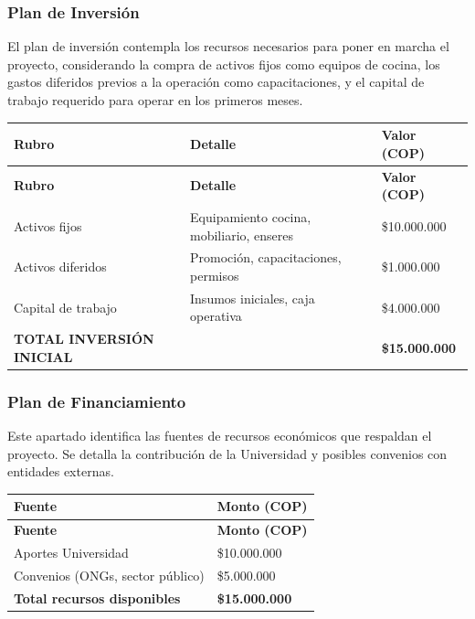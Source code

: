 \documentclass[letterpaper, 11pt]{report}
\begin{document}
\subsubsection{Plan de Inversión}
El plan de inversión contempla los recursos necesarios para poner en marcha el proyecto, considerando la compra de activos fijos como equipos de cocina, los gastos diferidos previos a la operación como capacitaciones, y el capital de trabajo requerido para operar en los primeros meses.

\bigskip

\begin{longtable}{|p{}|p{}|p{}|}
\hline
\textbf{Rubro} & \textbf{Detalle} & \textbf{Valor (COP)} \\
\hline
\endfirsthead

\hline
\textbf{Rubro} & \textbf{Detalle} & \textbf{Valor (COP)} \\
\hline
\endhead

\hline
\endfoot

\hline
\endlastfoot

Activos fijos & Equipamiento cocina, mobiliario, enseres & \$10.000.000 \\
\hline
Activos diferidos & Promoción, capacitaciones, permisos & \$1.000.000 \\
\hline
Capital de trabajo & Insumos iniciales, caja operativa & \$4.000.000 \\
\hline
\textbf{TOTAL INVERSIÓN INICIAL} & & \textbf{\$15.000.000} \\
\hline
\end{longtable}

\subsubsection{Plan de Financiamiento}
Este apartado identifica las fuentes de recursos económicos que respaldan el proyecto. Se detalla la contribución de la Universidad y posibles convenios con entidades externas.

\bigskip

\begin{longtable}{|p{}|p{}|}
\hline
\textbf{Fuente} & \textbf{Monto (COP)} \\
\hline
\endfirsthead

\hline
\textbf{Fuente} & \textbf{Monto (COP)} \\
\hline
\endhead

\hline
\endfoot

\hline
\endlastfoot

Aportes Universidad & \$10.000.000 \\
\hline
Convenios (ONGs, sector público) & \$5.000.000 \\
\hline
\textbf{Total recursos disponibles} & \textbf{\$15.000.000} \\
\hline
\end{longtable}
\end{document}
